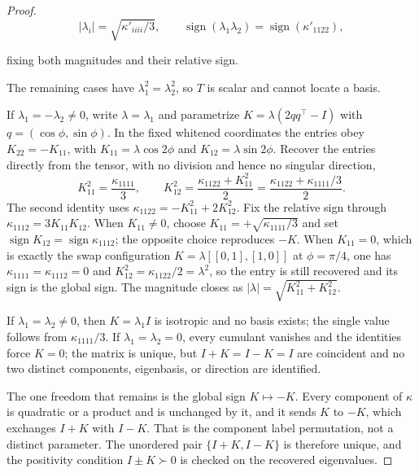 \begin{proof}
\begin{equation}\label{eq:point-id}
|\lambda_i|=\sqrt{\kappa'_{iiii}/3},\qquad
\operatorname{sign}(\lambda_1\lambda_2)=\operatorname{sign}(\kappa'_{1122}),
\end{equation}

fixing both magnitudes and their relative sign.

The remaining cases have $\lambda_1^2=\lambda_2^2$, so $T$ is scalar and cannot locate a basis.

If $\lambda_1=-\lambda_2\ne0$, write $\lambda=\lambda_1$ and parametrize $K=\lambda(2qq^\top-I)$ with $q=(\cos\phi,\sin\phi)$. In the fixed whitened coordinates the entries obey $K_{22}=-K_{11}$, with $K_{11}=\lambda\cos2\phi$ and $K_{12}=\lambda\sin2\phi$. Recover the entries directly from the tensor, with no division and hence no singular direction,
\begin{equation}\label{eq:direct-recover}
K_{11}^2=\frac{\kappa_{1111}}3,\qquad
K_{12}^2=\frac{\kappa_{1122}+K_{11}^2}{2}
=\frac{\kappa_{1122}+\kappa_{1111}/3}{2}.
\end{equation}
The second identity uses $\kappa_{1122}=-K_{11}^2+2K_{12}^2$. Fix the relative sign through $\kappa_{1112}=3K_{11}K_{12}$. When $K_{11}\ne0$, choose $K_{11}=+\sqrt{\kappa_{1111}/3}$ and set $\operatorname{sign}K_{12}=\operatorname{sign}\kappa_{1112}$; the opposite choice reproduces $-K$. When $K_{11}=0$, which is exactly the swap configuration $K=\lambda[[0,1],[1,0]]$ at $\phi=\pi/4$, one has $\kappa_{1111}=\kappa_{1112}=0$ and $K_{12}^2=\kappa_{1122}/2=\lambda^2$, so the entry is still recovered and its sign is the global sign. The magnitude closes as $|\lambda|=\sqrt{K_{11}^2+K_{12}^2}$.

If $\lambda_1=\lambda_2\ne0$, then $K=\lambda_1 I$ is isotropic and no basis exists; the single value follows from $\kappa_{1111}/3$. If $\lambda_1=\lambda_2=0$, every cumulant vanishes and the identities force $K=0$; the matrix is unique, but $I+K=I-K=I$ are coincident and no two distinct components, eigenbasis, or direction are identified.

The one freedom that remains is the global sign $K\mapsto-K$. Every component of $\kappa$ is quadratic or a product and is unchanged by it, and it sends $K$ to $-K$, which exchanges $I+K$ with $I-K$. That is the component label permutation, not a distinct parameter. The unordered pair $\{I+K,I-K\}$ is therefore unique, and the positivity condition $I\pm K\succ0$ is checked on the recovered eigenvalues.
\end{proof}

